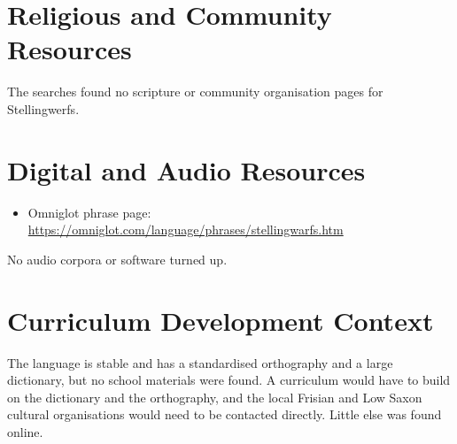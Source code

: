 \documentclass[12pt]{article}
\begin{document}
\section{Religious and Community Resources}
The searches found no scripture or community organisation pages for Stellingwerfs.

\section{Digital and Audio Resources}
\begin{itemize}
\item Omniglot phrase page: \url{https://omniglot.com/language/phrases/stellingwarfs.htm}
\end{itemize}
No audio corpora or software turned up.

\section{Curriculum Development Context}
The language is stable and has a standardised orthography and a large dictionary, but no school materials were found. A curriculum would have to build on the dictionary and the orthography, and the local Frisian and Low Saxon cultural organisations would need to be contacted directly. Little else was found online.
\end{document}
